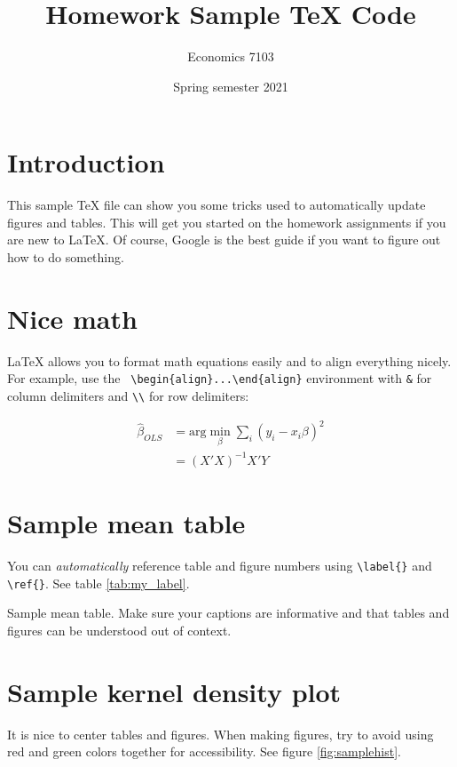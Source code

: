 \documentclass{article}
\title{Homework Sample TeX Code}
\author{Economics 7103}
\date{Spring semester 2021}
\begin{document}
  
\maketitle

\section{Introduction}

This sample TeX file can show you some tricks used to automatically update figures and tables.  This will get you started on the homework assignments if you are new to LaTeX.  Of course, Google is the best guide if you want to figure out how to do something.

\section{Nice math}
LaTeX allows you to format math equations easily and to align everything nicely.  For example, use the \verb! \begin{align}...\end{align}! environment with \verb!&! for column delimiters and \verb!\\! for row delimiters:

\begin{align}
    \hat{\beta}_{OLS} &= \text{arg}\min_{\beta} \sum_{i} (y_i - x_i \beta)^2 \\
    &= (X'X)^{-1}X'Y \label{eq:betahat}
\end{align}

\section{Sample mean table}
You can \textit{automatically} reference table and figure numbers using \verb!\label{}! and \verb!\ref{}!. See table \ref{tab:my_label}.

\begin{table}[h]
    \centering
    
    \caption{Sample mean table.  Make sure your captions are informative and that tables and figures can be understood out of context.}
    \label{tab:my_label}
\end{table}

\section{Sample kernel density plot}
It is nice to center tables and figures.  When making figures, try to avoid using red and green colors together for accessibility.  See figure \ref{fig:samplehist}.
\end{document}
